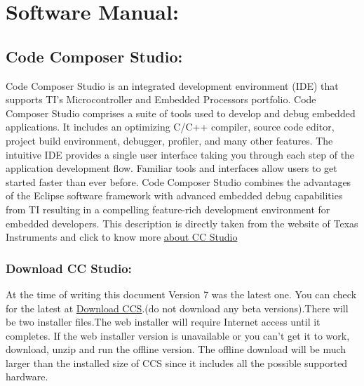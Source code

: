 \documentclass[a4paper,10pt,oneside]{article}
\begin{document}
{\begin{longtable}{|p{}|p{}|p{}|}
		\end{longtable}
	\newpage
	\section{\Huge\textbf{Software Manual:}}
		\subsection{\huge \textbf{Code Composer Studio:}}
			{\large Code Composer Studio is an integrated development environment (IDE) that supports TI's Microcontroller and Embedded Processors portfolio. Code Composer Studio comprises a suite of tools used to develop and debug embedded applications. It includes an optimizing C/C++ compiler, source code editor, project build environment, debugger, profiler, and many other features. The intuitive IDE provides a single user interface taking you through each step of the application development flow. Familiar tools and interfaces allow users to get started faster than ever before. Code Composer Studio combines the advantages of the Eclipse software framework with advanced embedded debug capabilities from TI resulting in a compelling feature-rich development environment for embedded developers. This description is directly taken from the website of Texas Instruments and click to know more	\href{http://www.ti.com/tool/ccstudio}{about CC Studio}}}%
			\subsubsection{\Large\textbf{Download CC Studio:}}
			{\large At the time of writing this document Version 7 was the latest one. You can check for the latest at \href{http://processors.wiki.ti.com/index.php/Download_CCS}{Download CCS}.(do not download
				any beta versions).There will be two installer files.The web installer will require Internet access until it	completes. If the web installer version is unavailable or you can’t get it to work,
				download, unzip and run the offline version. The offline download will be much larger
				than the installed size of CCS since it includes all the possible supported hardware.}
\end{document}

